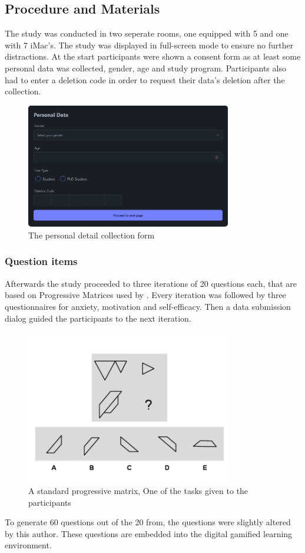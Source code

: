 \subsection{Procedure and Materials}
The study was conducted in two seperate rooms, one equipped with 5 and one with 7 iMac's. The study was displayed in full-screen mode to ensure no further distractions.
At the start participants were shown a consent form as at least some personal data was collected, gender, age and study program. Participants also had to enter a deletion code in order to request their data's deletion after the collection.
\begin{figure}[h]
    \centering
    \includegraphics[width=0.8\textwidth]{img/details.png}
    \caption{The personal detail collection form}
    \label{fig:figureDetails}
\end{figure}
\subsubsection{Question items}
Afterwards the study proceeded to three iterations of 20 questions each, that are based on Progressive Matrices used by \Textcite{albuquerqueDoesGenderStereotype2017}.
Every iteration was followed by three questionnaires for anxiety, motivation and self-efficacy. Then a data submission dialog guided the participants to the next iteration.
\begin{figure}[h]
    \centering
    \includegraphics[width=0.8\textwidth]{img/q-17.png}
    \caption{A standard progressive matrix, One of the tasks given to the participants}
    \label{fig:figureMatrix}
\end{figure}
To generate 60 questions out of the 20 from\textcite{albuquerqueDoesGenderStereotype2017}, the questions were slightly altered by this author.
These questions are embedded into the digital gamified learning environment.
